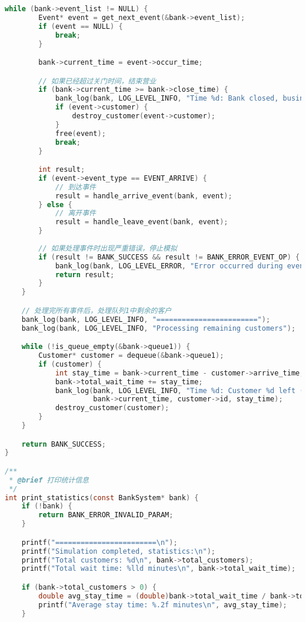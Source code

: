 \documentclass[12pt,a4paper]{article}
\begin{document}
\begin{lstlisting}[language=C,caption=bank\_simulation.c]
    while (bank->event_list != NULL) {
        Event* event = get_next_event(&bank->event_list);
        if (event == NULL) {
            break;
        }

        bank->current_time = event->occur_time;

        // 如果已经超过关门时间，结束营业
        if (bank->current_time >= bank->close_time) {
            bank_log(bank, LOG_LEVEL_INFO, "Time %d: Bank closed, business ended", bank->current_time);
            if (event->customer) {
                destroy_customer(event->customer);
            }
            free(event);
            break;
        }

        int result;
        if (event->event_type == EVENT_ARRIVE) {
            // 到达事件
            result = handle_arrive_event(bank, event);
        } else {
            // 离开事件
            result = handle_leave_event(bank, event);
        }
        
        // 如果处理事件时出现严重错误，停止模拟
        if (result != BANK_SUCCESS && result != BANK_ERROR_EVENT_OP) {
            bank_log(bank, LOG_LEVEL_ERROR, "Error occurred during event processing, stopping simulation");
            return result;
        }
    }

    // 处理完所有事件后，处理队列1中剩余的客户
    bank_log(bank, LOG_LEVEL_INFO, "========================");
    bank_log(bank, LOG_LEVEL_INFO, "Processing remaining customers");

    while (!is_queue_empty(&bank->queue1)) {
        Customer* customer = dequeue(&bank->queue1);
        if (customer) {
            int stay_time = bank->current_time - customer->arrive_time;
            bank->total_wait_time += stay_time;
            bank_log(bank, LOG_LEVEL_INFO, "Time %d: Customer %d left (business ended), total stay time %d", 
                     bank->current_time, customer->id, stay_time);
            destroy_customer(customer);
        }
    }

    return BANK_SUCCESS;
}

/**
 * @brief 打印统计信息
 */
int print_statistics(const BankSystem* bank) {
    if (!bank) {
        return BANK_ERROR_INVALID_PARAM;
    }

    printf("========================\n");
    printf("Simulation completed, statistics:\n");
    printf("Total customers: %d\n", bank->total_customers);
    printf("Total wait time: %lld minutes\n", bank->total_wait_time);

    if (bank->total_customers > 0) {
        double avg_stay_time = (double)bank->total_wait_time / bank->total_customers;
        printf("Average stay time: %.2f minutes\n", avg_stay_time);
    }


\end{lstlisting}
\end{document}
